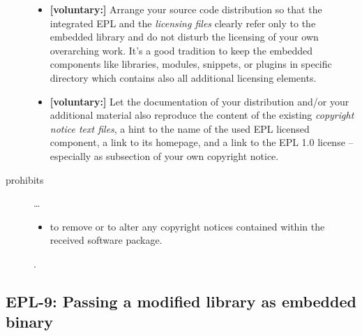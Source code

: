 \begin{description}
\begin{itemize}
  \item \textbf{[voluntary:]} Arrange your source code distribution so that the
  integrated EPL and the \emph{licensing files} clearly refer only to the
  embedded library and do not disturb the licensing of your own overarching
  work. It's a good tradition to keep the embedded components like libraries,
  modules, snippets, or plugins in specific directory which contains also all
  additional licensing elements.
  
  \item \textbf{[voluntary:]} Let the documentation of your distribution and/or
  your additional material also reproduce the content of the existing
  \emph{copyright notice text files}, a hint to the name of the used EPL
  licensed component, a link to its homepage, and a link to the EPL 1.0 license
  -- especially as subsection of your own copyright notice.
 
\end{itemize}

\item[prohibits] \ldots
\begin{itemize}
  \item to remove or to alter any copyright notices contained within the
  received software package.
\end{itemize}.

\end{description}


\subsection{EPL-9: Passing a modified library as embedded binary}

